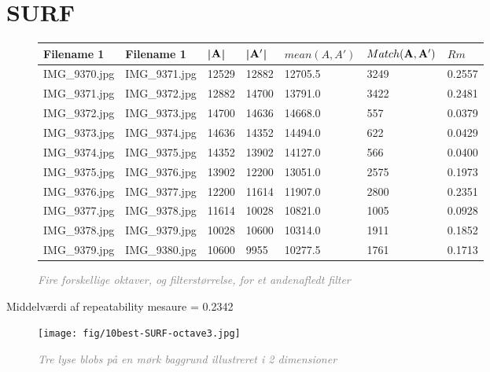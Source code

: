 \section{SURF}
\begin{figure}[H]
    \centering
    \begin{center}    
    \begin{tabular}{ | l | l | l | l | l | l | l |}
    \hline
    Filename 1 & Filename 1 & |$\bold{A}$| & |$\bold{A'}$| & $mean(A,A')$ & $Match(\bold{A}, \bold{A}')$ & $Rm$ \\ \hline
IMG\_9370.jpg &	IMG\_9371.jpg &	12529 &	12882 &	12705.5 &	3249 &	0.2557\\ \hline
IMG\_9371.jpg &	IMG\_9372.jpg &	12882 &	14700 &	13791.0 &	3422 &	0.2481\\ \hline
IMG\_9372.jpg &	IMG\_9373.jpg &	14700 &	14636 &	14668.0 &	557 &	0.0379\\ \hline
IMG\_9373.jpg &	IMG\_9374.jpg &	14636 &	14352 &	14494.0 &	622 &	0.0429\\ \hline
IMG\_9374.jpg &	IMG\_9375.jpg &	14352 &	13902 &	14127.0 &	566 &	0.0400\\ \hline
IMG\_9375.jpg &	IMG\_9376.jpg &	13902 &	12200 &	13051.0 &	2575 &	0.1973\\ \hline
IMG\_9376.jpg &	IMG\_9377.jpg &	12200 &	11614 &	11907.0 &	2800 &	0.2351\\ \hline
IMG\_9377.jpg &	IMG\_9378.jpg &	11614 &	10028 &	10821.0 &	1005 &	0.0928\\ \hline
IMG\_9378.jpg &	IMG\_9379.jpg &	10028 &	10600 &	10314.0 &	1911 &	0.1852\\ \hline
IMG\_9379.jpg &	IMG\_9380.jpg &	10600 &	9955 &	10277.5 &	1761 &	0.1713\\ \hline
    \end{tabular}       
    \caption{\textcolor{gray}{\footnotesize \textit{Fire forskellige oktaver, og filterstørrelse, for et andenafledt filter}}}
    \label{tab:SIFTOCTAVE3}
     \end{center}
     \vspace{-2.5em}
\end{figure} \noindent
Middelværdi af repeatability mesaure = 0.2342


\begin{figure}[H]
    \centering
    \texttt{[image: fig/10best-SURF-octave3.jpg]}
    \vspace{-0.5em}   
    \begin{center}
    \caption{\textcolor{gray}{\footnotesize \textit{
    Tre lyse blobs på en mørk baggrund illustreret i 2 dimensioner \cite{blob}}}}
    \label{fig:lindblob}
     \end{center}
  \end{figure}
       \vspace{-2.7em}
\noindent



